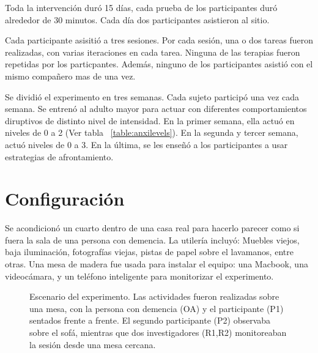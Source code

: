 Toda la intervenci\'on dur\'o 15 d\'ias, cada prueba de los participantes dur\'o alrededor de 30 minutos. Cada d\'ia dos participantes asistieron al sitio.

Cada participante asisiti\'o a tres sesiones. Por cada sesi\'on, una o dos tareas fueron realizadas, con varias iteraciones en cada tarea. Ninguna de las terapias fueron repetidas por los particpantes. Adem\'as, ninguno de los participantes asisti\'o con el mismo compa\~nero mas de una vez.

Se dividi\'o el experimento en tres semanas. Cada sujeto particip\'o una vez cada semana. Se entren\'o al adulto mayor para actuar con diferentes comportamientos diruptivos de distinto nivel de intensidad. En la primer semana, ella actu\'o en niveles de 0 a 2 (Ver tabla ~\ref{table:anxilevels}). En la segunda y tercer semana, actu\'o niveles de 0 a 3. En la \'ultima, se les ense\~n\'o a los participantes a usar estrategias de afrontamiento.
\section{Configuraci\'on}\label{secc:setup}
	Se acondicion\'o un cuarto dentro de una casa real para hacerlo parecer como si fuera la sala de una persona con demencia. La utiler\'ia incluy\'o: Muebles viejos, baja iluminaci\'on, fotograf\'ias viejas, pistas de papel sobre el lavamanos, entre otras. Una mesa de madera fue usada para instalar el equipo: una Macbook, una videoc\'amara, y un tel\'efono inteligente para monitorizar el experimento.
\begin{figure}[h!]
        \centering
	\caption{Escenario del experimento. Las actividades fueron realizadas sobre una mesa, con la persona con demencia (OA) y el participante (P1) sentados frente a frente. El segundo participante (P2) observaba sobre el sof\'a, mientras que dos investigadores (R1,R2) monitoreaban la sesi\'on desde una mesa cercana.} \label{fig:img_exp_setup}
\end{figure}

